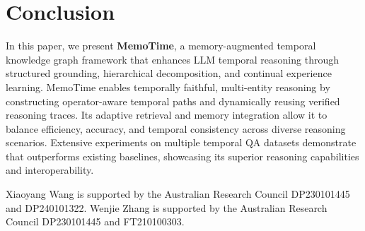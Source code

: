 
\vspace{-2mm}
\section{Conclusion}
\label{sec:conclusion}

In this paper, we present \textbf{MemoTime}, a memory-augmented temporal knowledge graph framework that enhances LLM temporal reasoning through structured grounding, hierarchical decomposition, and continual experience learning. 
MemoTime enables temporally faithful, multi-entity reasoning by constructing operator-aware temporal paths and dynamically reusing verified reasoning traces. 
Its adaptive retrieval and memory integration allow it to balance efficiency, accuracy, and temporal consistency across diverse reasoning scenarios. 
Extensive experiments on multiple temporal QA datasets demonstrate that \mot
outperforms existing baselines, showcasing its superior reasoning
capabilities and interoperability.

\begin{acks}
Xiaoyang Wang is supported by the Australian Research Council DP230101445 and DP240101322. Wenjie Zhang is supported by the Australian Research Council DP230101445 and FT210100303.
\end{acks}